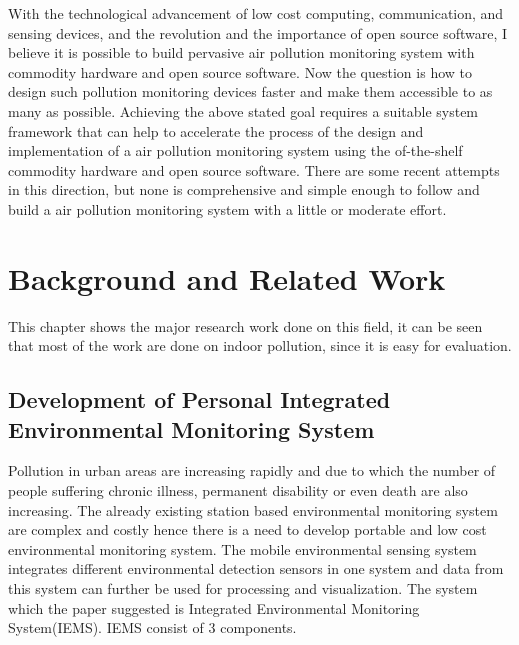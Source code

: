 \documentclass[11pt]{article}
\begin{document}
  With the technological advancement of low cost computing, communication, and sensing devices, and the revolution and the importance of open source software\cite{A16}, I believe it is possible to build pervasive air pollution monitoring system with commodity hardware and open source software. Now the question is how to design such pollution monitoring devices faster and make them accessible to as many as possible.
Achieving the above stated goal requires a suitable system framework that can help to accelerate the process of the design and implementation of a air pollution monitoring system using the of-the-shelf commodity hardware and open source software. There are some recent attempts in this direction, but none is comprehensive and simple enough to follow and build a air pollution monitoring system with a little or moderate effort. 


\section{Background and Related Work}
This chapter shows the major research work done on this field, it can be seen that most of the work are done on indoor pollution, since it is easy for evaluation.
\subsection{Development of Personal Integrated Environmental Monitoring System}

Pollution in urban areas are increasing rapidly and due to which the number of people suffering chronic illness, permanent disability or even death are also increasing. The already existing station based environmental monitoring system are complex and costly hence there is a need to develop portable and low cost environmental monitoring system. The mobile environmental sensing system integrates different environmental detection sensors in one system and data from this system can further be used for processing and visualization. The system which the paper suggested is Integrated Environmental Monitoring System(IEMS). IEMS consist of 3 components.
\end{document}

